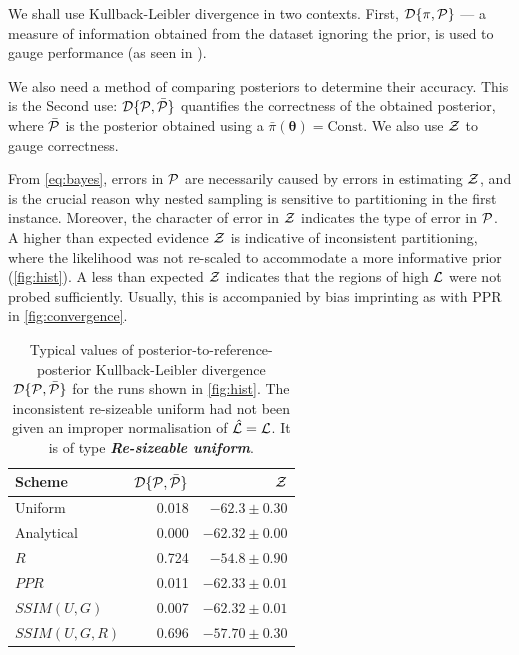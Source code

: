 \documentclass[usenatbib]{mnras}
\begin{document}
We shall use Kullback-Leibler divergence in two contexts. First,
${\cal D}\{\pi, {\cal P}\}$ --- a measure of information obtained from
the dataset ignoring the prior, is used to gauge performance (as seen
in ).

We also need a method of comparing posteriors to determine their
accuracy. This is the Second use:
${\cal D}\{ {\cal P}, \bar{\cal P} \}$ quantifies the correctness of
the obtained posterior, where $\bar{\cal P}$ is the posterior obtained
using a $\bar{\pi}(\bm{\theta}) = \text{Const}$. We also use
${\cal Z}$ to gauge correctness.

From \cref{eq:bayes}, errors in ${\cal P}$ are necessarily caused by
errors in estimating ${\cal Z}$, and is the crucial reason why nested
sampling is sensitive to partitioning in the first instance. Moreover,
the character of error in ${\cal Z}$ indicates the type of error in
${\cal P}$. A higher than expected evidence ${\cal Z}$ is indicative
of inconsistent partitioning, where the likelihood was not re-scaled
to accommodate a more informative prior (\cref{fig:hist}). A less than
expected ${\cal Z}$ indicates that the regions of high ${\cal L}$ were
not probed sufficiently. Usually, this is accompanied by bias
imprinting as with PPR in \cref{fig:convergence}.

\begin{table}
  \centering
  
  \caption{Typical values of posterior-to-reference-posterior
    Kullback-Leibler divergence ${\cal D}\{{\cal P}, \bar{\cal P}\}$
    for the runs shown in \cref{fig:hist}. The inconsistent
    re-sizeable uniform had not been given an improper normalisation
    of $\hat{\cal L} = {\cal L}$. It is of type \textbf{\emph{Re-sizeable
        uniform}}.}
  \begin{tabular}{lrr}
    \textbf{Scheme} & ${\cal D}\{ {\cal P}, \bar{\cal P}\}$ & ${\cal Z}$\\
    \hline
    Uniform & 0.018 & \(-62.3 \pm 0.30\)\\
    Analytical & 0.000 & \(-62.32 \pm 0.00\) \\
    $R$ & 0.724 & \(-54.8 \pm 0.90\)\\
    $PPR$ & 0.011 & \(-62.33 \pm 0.01\)\\
    $SSIM(U, G)$ & 0.007 & \(-62.32 \pm 0.01\)\\
    $SSIM(U, G, R)$ & 0.696 & \(-57.70 \pm 0.30\)\\
  \end{tabular}
  \label{tab:hist}
\end{table}
\end{document}
